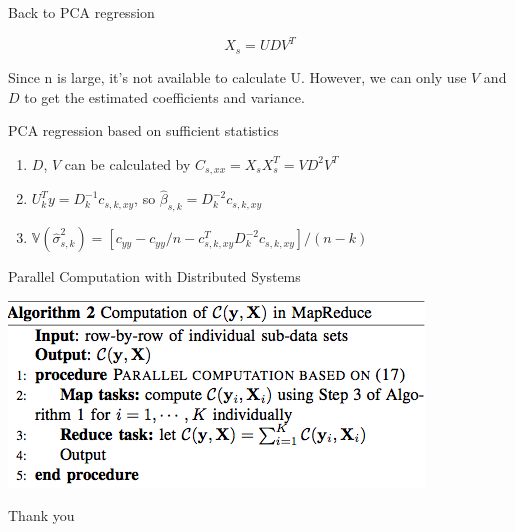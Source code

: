 \documentclass[ignorenonframetext,]{beamer}
\providecommand{\tightlist}{%
  \setlength{\itemsep}{0pt}\setlength{\parskip}{0pt}}
\begin{document}
\subsection{}\label{section}

\begin{frame}{Back to PCA regression}

\[
  X_s = UDV^T
\]

Since n is large, it's not available to calculate U. However, we can
only use \(V\) and \(D\) to get the estimated coefficients and variance.

\begin{block}{PCA regression based on sufficient statistics}

\begin{enumerate}
\def\labelenumi{\arabic{enumi}.}
\tightlist
\item
  \(D\), \(V\) can be calculated by \(C_{s, xx} = X_sX_s^T = VD^2V^T\)
\item
  \(U_k^Ty = D^{-1}_kc_{s,k,xy}\), so
  \(\hat{\beta}_{s,k} = D^{-2}_kc_{s,k,xy}\)
\item
  \(\mathbb{V}(\hat{\sigma}_{s,k}^2) = [c_{yy}-c_{yy}/n - c_{s,k,xy}^TD^{-2}_kc_{s,k,xy}]/(n-k)\)
\end{enumerate}

\end{block}

\end{frame}

\begin{frame}{Parallel Computation with Distributed Systems}

\includegraphics{./Alg_2.png}

\end{frame}

\begin{frame}{Thank you}

\end{frame}
\end{document}
